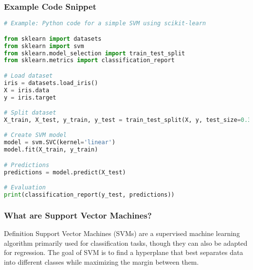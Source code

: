\documentclass[aspectratio=169]{beamer}
\begin{document}
\begin{frame}[fragile]
  \frametitle{Example Code Snippet}
  \begin{lstlisting}[language=Python]
# Example: Python code for a simple SVM using scikit-learn

from sklearn import datasets
from sklearn import svm
from sklearn.model_selection import train_test_split
from sklearn.metrics import classification_report

# Load dataset
iris = datasets.load_iris()
X = iris.data
y = iris.target

# Split dataset
X_train, X_test, y_train, y_test = train_test_split(X, y, test_size=0.3, random_state=42)

# Create SVM model
model = svm.SVC(kernel='linear')
model.fit(X_train, y_train)

# Predictions
predictions = model.predict(X_test)

# Evaluation
print(classification_report(y_test, predictions))
  \end{lstlisting}
\end{frame}

\begin{frame}[fragile]
    \frametitle{What are Support Vector Machines?}
    \begin{block}{Definition}
        Support Vector Machines (SVMs) are a supervised machine learning algorithm primarily used for classification tasks, though they can also be adapted for regression. 
        The goal of SVM is to find a hyperplane that best separates data into different classes while maximizing the margin between them.
    \end{block}
\end{frame}
\end{document}
